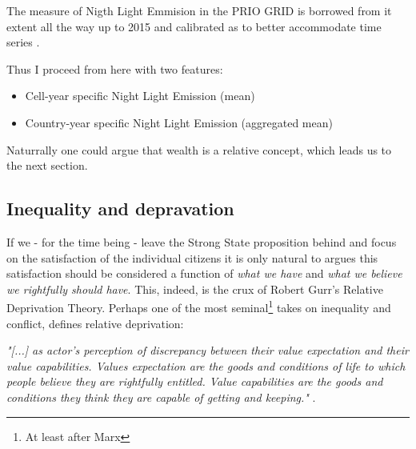 \documentclass[a4paper]{article}
\begin{document}
 The measure of Nigth Light Emmision in the PRIO GRID is borrowed from \cite{Elvidge_2014}it extent all the way up to 2015 and calibrated as to better accommodate time series \cite{prio_code_2015}.\par %
 
 Thus I proceed from here with two features:
 
 \begin{itemize}
     \item Cell-year specific Night Light Emission (mean)
     \item Country-year specific Night Light Emission (aggregated mean) 
 \end{itemize}

Naturrally one could argue that wealth is a relative concept, which leads us to the next section.

\subsection{Inequality and depravation} %

If we - for the time being - leave the Strong State proposition behind and focus on the satisfaction of the individual citizens it is only natural to argues this satisfaction should be considered a function of \emph{what we have} and \emph{what we believe we rightfully should have}. This, indeed, is the crux of Robert Gurr's \citeyearpar{Gurr_1970} Relative Deprivation Theory. Perhaps one of the most seminal\footnote{At least after Marx} takes on inequality and conflict, \cite{Gurr_1970} defines relative deprivation: 

\begin{displayquote}
\emph{"[...] as actor's perception of discrepancy between their value expectation and their value capabilities. Values expectation are the goods and conditions of life to which people believe they are rightfully entitled. Value capabilities are the goods and conditions they think they are capable of getting and keeping."} \citep[24]{Gurr_1970}. 
\end{displayquote}
\end{document}
